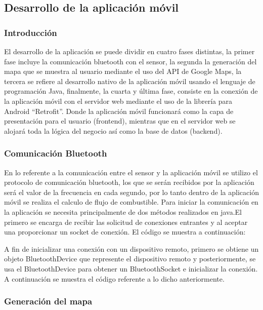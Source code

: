 \subsection{Desarrollo de la aplicación móvil}

\subsubsection{Introducción}
El desarrollo de la aplicación se puede dividir en cuatro fases distintas, la primer fase incluye la comunicación bluetooth con el sensor, la segunda la generación del mapa que se muestra al usuario mediante el uso del API de Google Maps, la tercera se refiere al desarrollo nativo de la aplicación móvil usando el lenguaje de programación Java, finalmente, la cuarta y última fase, consiste en la conexión de la aplicación móvil con el servidor web mediante el uso de la librería para Android ``Retrofit''. Donde la aplicación móvil funcionará como la capa de presentación para el usuario (frontend), mientras que en el servidor web se alojará toda la lógica del negocio así como la base de datos (backend).

\subsubsection{Comunicación Bluetooth}
En lo referente a la comunicación entre el sensor y la aplicación móvil se utilizo el protocolo de comunicación bluetooth, los que se serán recibidos por la aplicación será el valor de la frecuencia en cada segundo, por lo tanto dentro de la aplicación móvil se realiza el calculo de flujo de combustible.
\newline
Para iniciar la comunicación en la aplicación se necesita principalmente de dos métodos realizados en java.El primero se encarga de recibir las solicitud de conexiones entrantes y al aceptar una proporcionar un socket de conexión.
El código se muestra a continuación:

A fin de inicializar una conexión con un dispositivo remoto, primero se obtiene un objeto BluetoothDevice que represente el dispositivo remoto y posteriormente, se usa el BluetoothDevice para obtener un BluetoothSocket e inicializar la conexión.
A continuación se muestra el código referente a lo dicho anteriormente.


\subsubsection{Generación del mapa}


